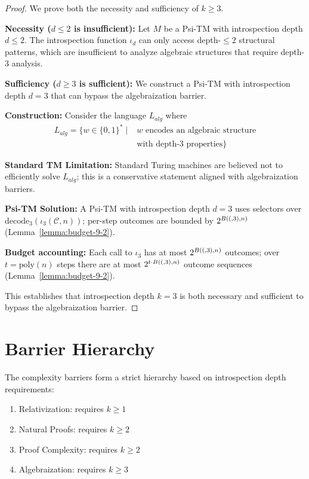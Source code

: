 \begin{proof}
We prove both the necessity and sufficiency of $k \geq 3$.

\textbf{Necessity ($d \le 2$ is insufficient):}
Let $M$ be a Psi-TM with introspection depth $d \leq 2$. The introspection function $\iota_d$ can only access depth-$\leq 2$ structural patterns, which are insufficient to analyze algebraic structures that require depth-3 analysis.

\textbf{Sufficiency ($d \ge 3$ is sufficient):}
We construct a Psi-TM with introspection depth $d = 3$ that can bypass the algebraization barrier.

\textbf{Construction:}
Consider the language $L_{alg}$ where
\begin{align}
L_{alg} = \{w \in \{0,1\}^* \mid &\text{$w$ encodes an algebraic structure} \nonumber \\
&\text{with depth-3 properties}\}
\end{align}

\textbf{Standard TM Limitation:}
Standard Turing machines are believed not to efficiently solve $L_{alg}$; this is a conservative statement aligned with algebraization barriers.

\textbf{Psi-TM Solution:}
A Psi-TM with introspection depth $d = 3$ uses selectors over $\mathrm{decode}_3(\iota_3(\mathcal{C},n))$; per-step outcomes are bounded by $2^{B((,3),n)}$ (Lemma~\ref{lemma:budget-9-2}).

\textbf{Budget accounting:}
Each call to $\iota_3$ has at most $2^{B((,3),n)}$ outcomes; over $t=\mathrm{poly}(n)$ steps there are at most $2^{t\cdot B((,3),n)}$ outcome sequences (Lemma~\ref{lemma:budget-9-2}).

This establishes that introspection depth $k = 3$ is both necessary and sufficient to bypass the algebraization barrier.
\end{proof}

\section{Barrier Hierarchy}

\begin{theorem}
The complexity barriers form a strict hierarchy based on introspection depth requirements:
\begin{enumerate}
\item Relativization: requires $k \geq 1$
\item Natural Proofs: requires $k \geq 2$
\item Proof Complexity: requires $k \geq 2$
\item Algebraization: requires $k \geq 3$
\end{enumerate}
\end{theorem}

